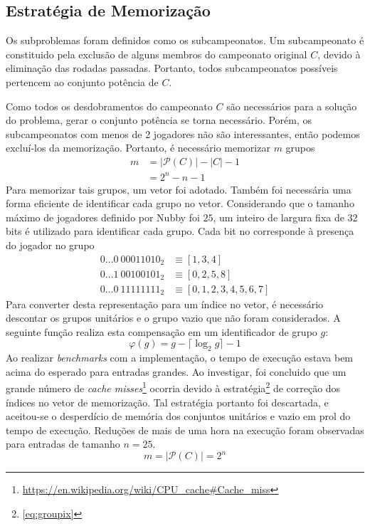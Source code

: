 \documentclass{article}
\begin{document}
\subsection{Estratégia de Memorização}
Os subproblemas foram definidos como os subcampeonatos. Um subcampeonato é constituido pela exclusão de alguns membros do campeonato original $C$, devido à eliminação das rodadas passadas. Portanto, todos subcampeonatos possíveis pertencem ao conjunto potência de $C$.

Como todos os desdobramentos do campeonato $C$ são necessários para a solução do problema, gerar o conjunto potência se torna necessário. Porém, os subcampeonatos com menos de 2 jogadores não são interessantes, então podemos excluí-los da memorização. Portanto, é necessário memorizar $m$ grupos
\begin{align*}
  m & = |\mathcal{P}(C)| - |C| - 1 \\
  & = 2^n - n - 1
\end{align*}
Para memorizar tais grupos, um vetor foi adotado. Também foi necessária uma forma eficiente de identificar cada grupo no vetor. Considerando que o tamanho máximo de jogadores definido por Nubby foi $25$, um inteiro de largura fixa de 32 bits é utilizado para identificar cada grupo. Cada bit no corresponde à presença do jogador no grupo
\begin{align*}
  0 \hdots 0 \> 00011010_2 &\equiv [1, 3, 4] \\
  0 \hdots 1 \> 00100101_2 &\equiv [0, 2, 5, 8] \\
  0 \hdots 0 \> 11111111_2 &\equiv [0, 1, 2, 3, 4, 5, 6, 7]
\end{align*}
Para converter desta representação para um índice no vetor, é necessário descontar os grupos unitários e o grupo vazio que não foram considerados. A seguinte função realiza esta compensação em um identificador de grupo $g$:
\begin{equation} \label{eq:groupix}
  \varphi(g) = g - \lceil \log_2 g \rceil - 1
\end{equation}
Ao realizar \textit{benchmarks} com a implementação, o tempo de execução estava bem acima do esperado para entradas grandes. Ao investigar, foi concluido que um grande número de \textit{cache misses}\footnote{\url{https://en.wikipedia.org/wiki/CPU_cache\#Cache_miss}} ocorria devido à estratégia\footnote{\autoref{eq:groupix}} de correção dos índices no vetor de memorização. Tal estratégia portanto foi descartada, e aceitou-se o desperdício de memória dos conjuntos unitários e vazio em prol do tempo de execução. Reduções de mais de uma hora na execução foram observadas para entradas de tamanho $n = 25$.
\begin{equation} \label{eq:memory}
  m = |\mathcal{P}(C)| = 2^n
\end{equation}
\pagebreak
\end{document}
